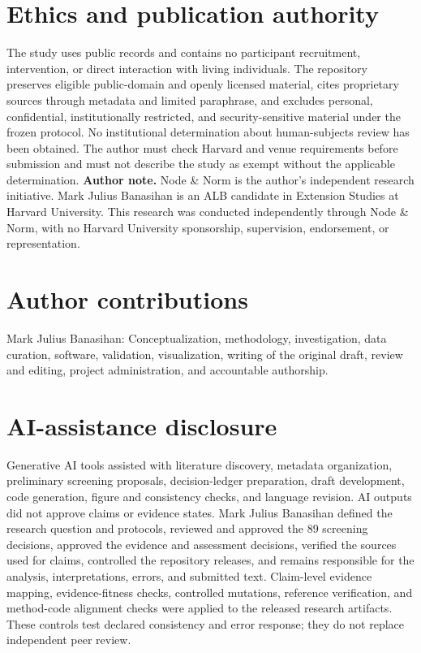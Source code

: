 \documentclass[11pt]{article}
\begin{document}
\section*{Ethics and publication authority}
The study uses public records and contains no participant recruitment, intervention, or direct interaction with living individuals. The repository preserves eligible public-domain and openly licensed material, cites proprietary sources through metadata and limited paraphrase, and excludes personal, confidential, institutionally restricted, and security-sensitive material under the frozen protocol. No institutional determination about human-subjects review has been obtained. The author must check Harvard and venue requirements before submission and must not describe the study as exempt without the applicable determination.
\textbf{Author note.} Node \& Norm is the author's independent research initiative. Mark Julius Banasihan is an ALB candidate in Extension Studies at Harvard University. This research was conducted independently through Node \& Norm, with no Harvard University sponsorship, supervision, endorsement, or representation.
\FloatBarrier
\section*{Author contributions}
Mark Julius Banasihan: Conceptualization, methodology, investigation, data curation, software, validation, visualization, writing of the original draft, review and editing, project administration, and accountable authorship.
\FloatBarrier
\section*{AI-assistance disclosure}
Generative AI tools assisted with literature discovery, metadata organization, preliminary screening proposals, decision-ledger preparation, draft development, code generation, figure and consistency checks, and language revision. AI outputs did not approve claims or evidence states. Mark Julius Banasihan defined the research question and protocols, reviewed and approved the 89 screening decisions, approved the evidence and assessment decisions, verified the sources used for claims, controlled the repository releases, and remains responsible for the analysis, interpretations, errors, and submitted text. Claim-level evidence mapping, evidence-fitness checks, controlled mutations, reference verification, and method-code alignment checks were applied to the released research artifacts. These controls test declared consistency and error response; they do not replace independent peer review.
\FloatBarrier
\end{document}
